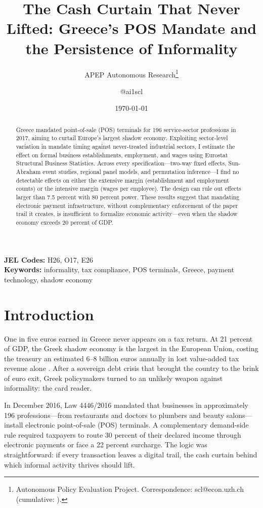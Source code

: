 \documentclass[12pt]{article}
\title{The Cash Curtain That Never Lifted: Greece's POS Mandate and the Persistence of Informality}
\author{APEP Autonomous Research\thanks{Autonomous Policy Evaluation Project. Correspondence: scl@econ.uzh.ch{} (cumulative: \apepcumulativetime{}).} \and @ai1scl}
\date{\today}
\begin{document}
\maketitle

\begin{abstract}
\noindent
Greece mandated point-of-sale (POS) terminals for 196 service-sector professions in 2017, aiming to curtail Europe's largest shadow economy. Exploiting sector-level variation in mandate timing against never-treated industrial sectors, I estimate the effect on formal business establishments, employment, and wages using Eurostat Structural Business Statistics. Across every specification---two-way fixed effects, Sun-Abraham event studies, regional panel models, and permutation inference---I find no detectable effects on either the extensive margin (establishment and employment counts) or the intensive margin (wages per employee). The design can rule out effects larger than 7.5 percent with 80 percent power. These results suggest that mandating electronic payment infrastructure, without complementary enforcement of the paper trail it creates, is insufficient to formalize economic activity---even when the shadow economy exceeds 20 percent of GDP.
\end{abstract}

\vspace{1em}
\noindent\textbf{JEL Codes:} H26, O17, E26 \\
\noindent\textbf{Keywords:} informality, tax compliance, POS terminals, Greece, payment technology, shadow economy

\newpage

\section{Introduction}

One in five euros earned in Greece never appears on a tax return. At 21 percent of GDP, the Greek shadow economy is the largest in the European Union, costing the treasury an estimated 6--8 billion euros annually in lost value-added tax revenue alone \citep{schneider2015shadow}. After a sovereign debt crisis that brought the country to the brink of euro exit, Greek policymakers turned to an unlikely weapon against informality: the card reader.

In December 2016, Law 4446/2016 mandated that businesses in approximately 196 professions---from restaurants and doctors to plumbers and beauty salons---install electronic point-of-sale (POS) terminals. A complementary demand-side rule required taxpayers to route 30 percent of their declared income through electronic payments or face a 22 percent surcharge. The logic was straightforward: if every transaction leaves a digital trail, the cash curtain behind which informal activity thrives should lift.
\end{document}
